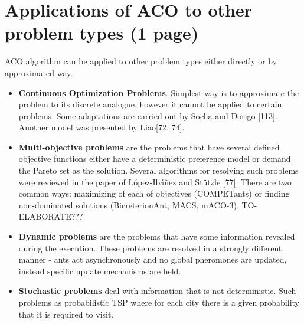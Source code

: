 \section{Applications of ACO to other problem types (1 page)}
ACO algorithm can be applied to other problem types either directly or by approximated way.

\begin{itemize}
\item \textbf{Continuous Optimization Problems}. Simplest way is to approximate the problem to its discrete analogue, however it cannot be applied to certain problems. Some adaptations are carried out by Socha and Dorigo [113]. Another model was presented by Liao[72, 74].

\item \textbf{Multi-objective problems} are the problems that have several defined objective functions either have a deterministic preference model or demand the Pareto set as the solution. Several algorithms for resolving such problems were reviewed in the paper of López-Ibáñez and Stützle [77]. There are two common ways: maximizing of each of objectives (COMPETants) or finding non-dominated solutions (BicreterionAnt, MACS, mACO-3). TO-ELABORATE???

\item \textbf{Dynamic problems} are the problems that have some information revealed during the execution. These problems are resolved in a strongly different manner - ants act asynchronously and no global pheromones are updated, instead specific update mechanisms are held.

\item \textbf{Stochastic problems} deal with information that is not deterministic. Such problems as probabilistic TSP where for each city there is a given probability that it is required to visit.
\end{itemize}